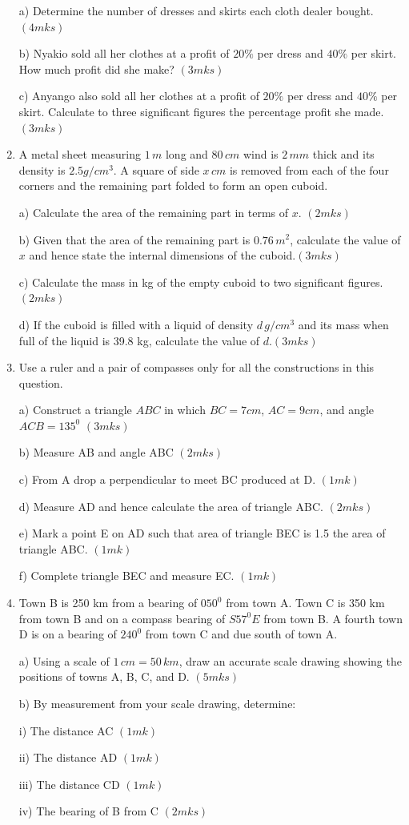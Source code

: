 \documentclass[
  a4paperpaper,
]{scrbook}
\begin{document}
\begin{tcolorbox}
\begin{enumerate}
  a) Determine the number of dresses and skirts each cloth dealer
  bought.\((4mks)\)

  b) Nyakio sold all her clothes at a profit of \(20\%\) per dress and
  \(40\%\) per skirt. How much profit did she make? \((3mks)\)

  c) Anyango also sold all her clothes at a profit of \(20\%\) per dress
  and \(40\%\) per skirt. Calculate to three significant figures the
  percentage profit she made. \((3mks)\)
\item
  A metal sheet measuring \(1 \,m\) long and \(80 \,cm\) wind is
  \(2\,mm\) thick and its density is \(2.5 g/cm^3\). A square of side
  \(x\, cm\) is removed from each of the four corners and the remaining
  part folded to form an open cuboid.

  a) Calculate the area of the remaining part in terms of \(x\).
  \((2mks)\)

  b) Given that the area of the remaining part is \(0.76 \,m^2\),
  calculate the value of \(x\) and hence state the internal dimensions
  of the cuboid.\((3mks)\)

  c) Calculate the mass in kg of the empty cuboid to two significant
  figures.\((2mks)\)

  d) If the cuboid is filled with a liquid of density \(d \,g/cm^3\) and
  its mass when full of the liquid is 39.8 kg, calculate the value of
  \(d\).\((3mks)\)
\item
  Use a ruler and a pair of compasses only for all the constructions in
  this question.

  a) Construct a triangle \(ABC\) in which \(BC=7cm\), \(AC=9cm\), and
  angle \(ACB=135^0\) \((3mks)\)

  b) Measure AB and angle ABC \((2mks)\)

  c) From A drop a perpendicular to meet BC produced at D. \((1mk)\)

  d) Measure AD and hence calculate the area of triangle ABC. \((2mks)\)

  e) Mark a point E on AD such that area of triangle BEC is 1.5 the area
  of triangle ABC. \((1mk)\)

  f) Complete triangle BEC and measure EC. \((1mk)\)
\item
  Town B is 250 km from a bearing of \(050^0\) from town A. Town C is
  350 km from town B and on a compass bearing of \(S57^0E\) from town B.
  A fourth town D is on a bearing of \(240^0\) from town C and due south
  of town A.

  a) Using a scale of \(1\,cm=50 \,km\), draw an accurate scale drawing
  showing the positions of towns A, B, C, and D. \((5mks)\)

  b) By measurement from your scale drawing, determine:

  i) The distance AC \((1mk)\)

  ii) The distance AD \((1mk)\)

  iii) The distance CD \((1mk)\)

  iv) The bearing of B from C \((2mks)\)
\end{enumerate}

\end{tcolorbox}
\end{document}
